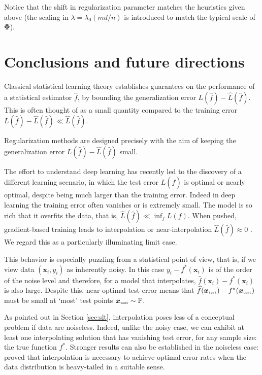   Notice that the shift in regularization parameter matches the heuristics given above (the scaling in $\lambda=\lambda_0(md/n)$ is introduced to match the typical scale of ${\boldsymbol \Phi}$).

\section{Conclusions and future directions}
\label{sec:future}

Classical statistical learning theory establishes guarantees on the performance of a  statistical estimator ${\widehat f}$, by bounding the generalization error ${L}({\widehat f}) - \widehat{L}({\widehat f})$. This is often thought of as a small quantity compared to the training error ${L}({\widehat f}) - \widehat{L}({\widehat f})\ll \widehat{L}({\widehat f})$.

Regularization methods are designed precisely with the aim of keeping  the generalization error ${L}({\widehat f}) - \widehat{L}({\widehat f}) $ small.

The effort to understand deep learning has recently led to the discovery of a different learning scenario, in which the test error ${L}({\widehat f})$ is optimal or nearly optimal, despite being much larger than the training error. Indeed in deep learning the training error often  vanishes or is extremely small. The model is so rich that it overfits the data, that is, $\widehat{L}({\widehat f})\ll \inf_f{L}(f)$.
When pushed, gradient-based training leads to interpolation or near-interpolation   $\widehat{L}({\widehat f})\approx 0$ \cite{zhang2016understanding}. We regard this as a particularly illuminating limit case.

This behavior is especially puzzling from a statistical point of view, that is, if we view data
$({\boldsymbol x}_i,y_i)$ as inherently noisy. In this case $y_i-f^*({\boldsymbol x}_i)$ is of the order of the noise level and therefore,  for a model that interpolates, ${\widehat f}({\boldsymbol x}_i)-f^*({\boldsymbol x}_i)$ is also large. Despite this, near-optimal test error means that
${\widehat f}({\boldsymbol x}_{\mbox{\tiny\rm test}})-f^*({\boldsymbol x}_{\mbox{\tiny\rm test}})$ must be small   at `most'  test points ${\boldsymbol x}_{\mbox{\tiny\rm test}}\sim
\mathbb{P}$.

As pointed out in Section \ref{sec:slt}, interpolation poses less of a conceptual problem if data are noiseless. Indeed, unlike the noisy case, we can exhibit at least one interpolating solution that has vanishing test error, for any sample size: the true function $f^*$. Stronger results can also be established in the noiseless case: \cite{feldman2020does} proved that interpolation is necessary to achieve optimal error rates when the data distribution is heavy-tailed in a suitable sense.

